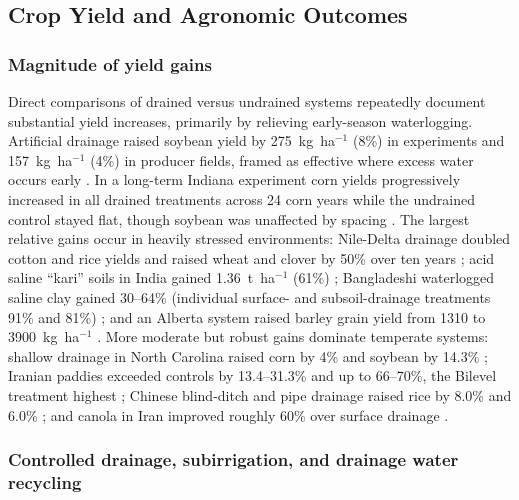 \documentclass[11pt]{article}
\begin{document}
\subsection{Crop Yield and Agronomic Outcomes}

\subsubsection{Magnitude of yield gains}

Direct comparisons of drained versus undrained systems repeatedly document
substantial yield increases, primarily by relieving early-season waterlogging.
Artificial drainage raised soybean yield by 275~kg~ha$^{-1}$ (8\%) in experiments
and 157~kg~ha$^{-1}$ (4\%) in producer fields, framed as effective where excess
water occurs early \parencite{Mourtzinis2021}. In a long-term Indiana experiment
corn yields progressively increased in all drained treatments across 24 corn
years while the undrained control stayed flat, though soybean was unaffected by
spacing \parencite{Rui2024,Kladivko2005}. The largest relative gains occur in
heavily stressed environments: Nile-Delta drainage doubled cotton and rice yields
and raised wheat and clover by 50\% over ten years \parencite{ELMOWELHI1988};
acid saline ``kari'' soils in India gained 1.36~t~ha$^{-1}$ (61\%)
\parencite{Mathew2001}; Bangladeshi waterlogged saline clay gained 30--64\%
(individual surface- and subsoil-drainage treatments 91\% and 81\%)
\parencite{Islam2025,Islam2022}; and an Alberta system raised barley grain yield
from 1310 to 3900~kg~ha$^{-1}$ \parencite{BENNETT1982}. More moderate but robust
gains dominate temperate systems: shallow drainage in North Carolina raised corn
by 4\% and soybean by 14.3\% \parencite{Watkins2024}; Iranian paddies exceeded
controls by 13.4--31.3\% and up to 66--70\%, the Bilevel treatment highest
\parencite{DarziNaftchali2017b,DarziNaftchali2014}; Chinese blind-ditch and pipe
drainage raised rice by 8.0\% and 6.0\% \parencite{Qi2025b}; and canola in Iran
improved roughly 60\% over surface drainage
\parencite{Asgari2021,Yang2022,Zhang2024c,SerranoCoronel2018}.

\subsubsection{Controlled drainage, subirrigation, and drainage water recycling}
\end{document}
